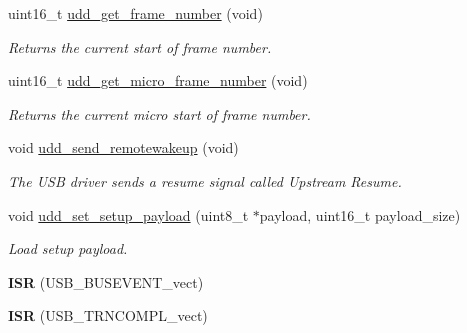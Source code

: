 \begin{DoxyCompactItemize}
uint16\-\_\-t \hyperlink{group__udd__xmega__usb__group_ga96dc248cc05e07ffe2cf21e4d7465320}{udd\-\_\-get\-\_\-frame\-\_\-number} (void)
\begin{DoxyCompactList}\small\item\em Returns the current start of frame number. \end{DoxyCompactList}\item 
uint16\-\_\-t \hyperlink{group__udd__xmega__usb__group_ga63047eec59b8e8798ca1d3366472d82b}{udd\-\_\-get\-\_\-micro\-\_\-frame\-\_\-number} (void)
\begin{DoxyCompactList}\small\item\em Returns the current micro start of frame number. \end{DoxyCompactList}\item 
\hypertarget{group__udd__xmega__usb__group_gac447212e04789282dabee65a23fe2a08}{void \hyperlink{group__udd__xmega__usb__group_gac447212e04789282dabee65a23fe2a08}{udd\-\_\-send\-\_\-remotewakeup} (void)}\label{group__udd__xmega__usb__group_gac447212e04789282dabee65a23fe2a08}

\begin{DoxyCompactList}\small\item\em The U\-S\-B driver sends a resume signal called Upstream Resume. \end{DoxyCompactList}\item 
void \hyperlink{group__udd__xmega__usb__group_ga017ef5ea7626be258c24d345218976f9}{udd\-\_\-set\-\_\-setup\-\_\-payload} (uint8\-\_\-t $\ast$payload, uint16\-\_\-t payload\-\_\-size)
\begin{DoxyCompactList}\small\item\em Load setup payload. \end{DoxyCompactList}\item 
\hypertarget{group__udd__xmega__usb__group_gaa6bf260d50629e273f98ad8ad2a80f9c}{{\bfseries I\-S\-R} (U\-S\-B\-\_\-\-B\-U\-S\-E\-V\-E\-N\-T\-\_\-vect)}\label{group__udd__xmega__usb__group_gaa6bf260d50629e273f98ad8ad2a80f9c}

\item 
\hypertarget{group__udd__xmega__usb__group_gaee3be329a6b2d2c6c882c63dbf32b83c}{{\bfseries I\-S\-R} (U\-S\-B\-\_\-\-T\-R\-N\-C\-O\-M\-P\-L\-\_\-vect)}\label{group__udd__xmega__usb__group_gaee3be329a6b2d2c6c882c63dbf32b83c}

\end{DoxyCompactItemize}
